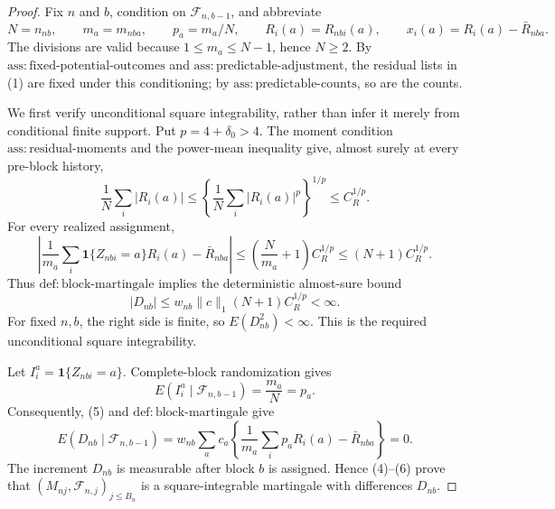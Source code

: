 \documentclass{article}
\begin{document}
\begin{proof}
Fix \(n\) and \(b\), condition on \(\mathcal F_{n,b-1}\), and abbreviate
\[
N=n_{nb},\qquad m_a=m_{nba},\qquad p_a=m_a/N,
\qquad R_i(a)=R_{nbi}(a),\qquad x_i(a)=R_i(a)-\bar R_{nba}.
\tag{1}
\]
The divisions are valid because \(1\le m_a\le N-1\), hence \(N\ge2\). By \(\mathrm{ass:fixed\text{-}potential\text{-}outcomes}\) and \(\mathrm{ass:predictable\text{-}adjustment}\), the residual lists in (1) are fixed under this conditioning; by \(\mathrm{ass:predictable\text{-}counts}\), so are the counts.

We first verify unconditional square integrability, rather than infer it merely from conditional finite support. Put \(p=4+\delta_0>4\). The moment condition \(\mathrm{ass:residual\text{-}moments}\) and the power-mean inequality give, almost surely at every pre-block history,
\[
\frac1N\sum_i|R_i(a)|
\le\left\{\frac1N\sum_i|R_i(a)|^p\right\}^{1/p}
\le C_R^{1/p}.
\tag{2}
\]
For every realized assignment,
\[
\left|\frac1{m_a}\sum_i\mathbf1\{Z_{nbi}=a\}R_i(a)-\bar R_{nba}\right|
\le\left(\frac N{m_a}+1\right)C_R^{1/p}
\le(N+1)C_R^{1/p}.
\tag{3}
\]
Thus \(\mathrm{def:block\text{-}martingale}\) implies the deterministic almost-sure bound
\[
|D_{nb}|\le w_{nb}\|c\|_1(N+1)C_R^{1/p}<\infty.
\tag{4}
\]
For fixed \(n,b\), the right side is finite, so \(E(D_{nb}^2)<\infty\). This is the required unconditional square integrability.

Let \(I_i^a=\mathbf1\{Z_{nbi}=a\}\). Complete-block randomization gives
\[
E(I_i^a\mid\mathcal F_{n,b-1})=\frac{m_a}{N}=p_a.
\tag{5}
\]
Consequently, (5) and \(\mathrm{def:block\text{-}martingale}\) give
\[
E(D_{nb}\mid\mathcal F_{n,b-1})
=w_{nb}\sum_ac_a\left\{\frac1{m_a}\sum_i p_aR_i(a)-\bar R_{nba}\right\}=0.
\tag{6}
\]
The increment \(D_{nb}\) is measurable after block \(b\) is assigned. Hence (4)--(6) prove that \((M_{nj},\mathcal F_{n,j})_{j\le B_n}\) is a square-integrable martingale with differences \(D_{nb}\).


\end{proof}
\end{document}
